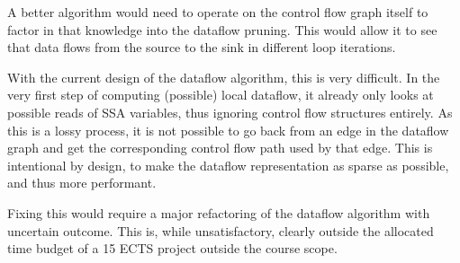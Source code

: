 A better algorithm would need to operate on the control flow graph itself to
factor in that knowledge into the dataflow pruning.
This would allow it to see that data flows from the source to the sink in different 
loop iterations.

With the current design of the dataflow algorithm, this is very difficult.
In the very first step of computing (possible) local dataflow, it already 
only looks at possible reads of SSA variables, thus ignoring control flow structures
entirely.
As this is a lossy process, it is not possible to go back from an edge in the
dataflow graph and get the corresponding control flow path used by that edge.
This is intentional by design, to make the dataflow representation as sparse 
as possible, and thus more performant.

Fixing this would require a major refactoring of the dataflow algorithm with 
uncertain outcome.
This is, while unsatisfactory, clearly outside the allocated time budget
of a 15 ECTS project outside the course scope.






